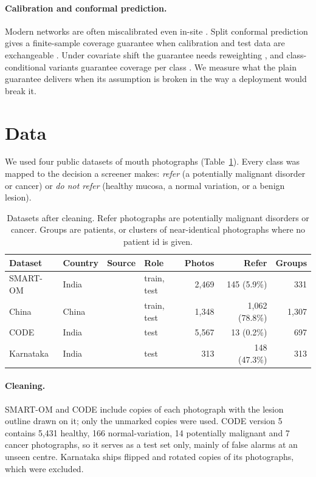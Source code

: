 \documentclass[11pt]{article}
\begin{document}
\paragraph{Calibration and conformal prediction.} Modern networks are often miscalibrated even in-site \citep{guo2017calibration}. Split conformal prediction gives a finite-sample coverage guarantee when calibration and test data are exchangeable \citep{vovk2005algorithmic, angelopoulos2021gentle}. Under covariate shift the guarantee needs reweighting \citep{tibshirani2019covariate}, and class-conditional variants guarantee coverage per class \citep{sadinle2019least}. We measure what the plain guarantee delivers when its assumption is broken in the way a deployment would break it.

\section{Data}
\label{sec:data}

We used four public datasets of mouth photographs (Table~\ref{tab:data}). Every class was mapped to the decision a screener makes: \emph{refer} (a potentially malignant disorder or cancer) or \emph{do not refer} (healthy mucosa, a normal variation, or a benign lesion).

\begin{table}[t]
\centering
\caption{Datasets after cleaning. Refer photographs are potentially malignant disorders or cancer. Groups are patients, or clusters of near-identical photographs where no patient id is given.}
\label{tab:data}
\small
\begin{tabular}{llllrrr}
\toprule
Dataset & Country & Source & Role & Photos & Refer & Groups \\
\midrule
SMART-OM & India & \citet{smartom2026} & train, test & 2{,}469 & 145 (5.9\%) & 331 \\
China & China & \citet{yu2026opmd} & train, test & 1{,}348 & 1{,}062 (78.8\%) & 1{,}307 \\
CODE & India & \citet{code2026} & test & 5{,}567 & 13 (0.2\%) & 697 \\
Karnataka & India & \citet{karnataka2021} & test & 313 & 148 (47.3\%) & 313 \\
\bottomrule
\end{tabular}
\end{table}

\paragraph{Cleaning.} SMART-OM and CODE include copies of each photograph with the lesion outline drawn on it; only the unmarked copies were used. CODE version 5 contains 5{,}431 healthy, 166 normal-variation, 14 potentially malignant and 7 cancer photographs, so it serves as a test set only, mainly of false alarms at an unseen centre. Karnataka ships flipped and rotated copies of its photographs, which were excluded.
\end{document}
